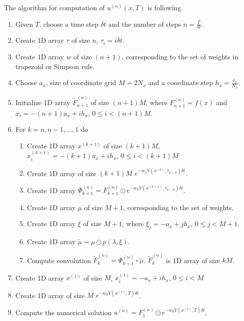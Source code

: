 \documentclass[11pt,a4paper]{extarticle}
\begin{document}
The algorithm for computation of $u^{(n)}(x, T)$ is following.

\begin{enumerate}
    \item Given $T$, choose a time step $\delta t$ and the number of steps $n = \frac T{\delta t}$.
    \item Create 1D array $\tau$ of size $n$, $\tau_i = i \delta t$.
    \item Create 1D array $w$ of size $(n+1)$, corresponding to the set of weights in trapezoid or Simpson rule.
    \item Choose $a_x$, size of coordinate grid $M = 2N_x$ and a coordinate step $h_x = \frac{a_x}{N_x}$.
    \item Initialize 1D array $\tilde F_{n+1}^{(n)}$ of size $(n+1)M$, where $F_{n+1}^{(n)} = f(x)$ and $x_i = -(n+1)a_x + ih_x$, $0 \leq i < (n+1)M$.
    \item For $k = n, n-1, \dots, 1$ do
        \begin{enumerate}
        \item Create 1D array $x^{(k+1)}$ of size $(k+1)M$, $x_i^{(k+1)} = -(k+1)a_x + ih_x$, $0 \leq i < (k+1)M$
        \item Create 1D array of size $(k + 1)M$ $e^{-w_k V(x^{(k)}, \tau_{n-k}) \delta t}$.
        \item Create 1D array $\Phi_{k+1}^{(n)} = F_{k+1}^{(n)} \odot e^{-w_k V(x^{(k+1)}, \tau_{n-k}) \delta t}$.
        \item Create 1D array $\mu$ of size $M+1$, corresponding to the set of weights.
        \item Create 1D array $\xi$ of size $M+1$, where $\xi_j = -a_x + jh_x$, $0 \leq j < M+1$.
        \item Create 1D array $\tilde\mu = \mu \odot p(\lambda, \xi)$.
        \item Compute convolution $\tilde F_k^{(n)} = \Phi_{k+1}^{(n)} \circ \tilde\mu$. $\tilde F_k^{(n)}$ is 1D array of size $kM$.
        \end{enumerate}
    \item Create 1D array $x^{(1)}$ of size $M$, $x_i^{(1)} = -a_x + ih_x$, $0 \leq i < M$
    \item Create 1D array of size $M$ $e^{-w_0 V(x^{(1)}, T) \delta t}$.
    \item Compute the numerical solution $u^{(n)} = F_1^{(n)} \odot e^{-w_0 V(x^{(1)}, T) \delta t}$.

\end{enumerate}
\end{document}
